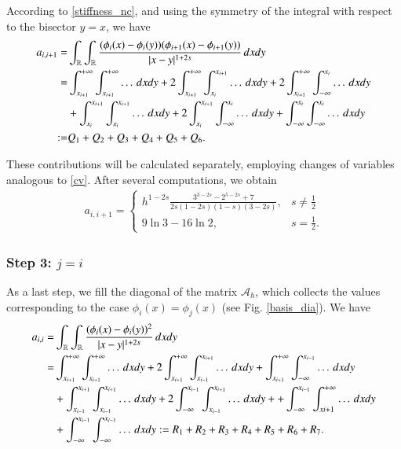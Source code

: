According to \eqref{stiffness_nc}, and using the symmetry of the integral with respect to the bisector $y=x$, we have 
	\begin{align*}
	a_{i,i+1}= & \int_{\mathbb{R}}\int_{\mathbb{R}}\frac{(\phi_i(x)-\phi_i(y))(\phi_{i+1}(x)-\phi_{i+1}(y))}{|x-y|^{1+2s}}\,dxdy
	\\
	= & \int_{x_{i+1}}^{+\infty}\int_{x_{i+1}}^{+\infty} \ldots\,dxdy + 2\int_{x_{i+1}}^{+\infty}\int_{x_i}^{x_{i+1}} \ldots\,dxdy + 2\int_{x_{i+1}}^{+\infty}\int_{-\infty}^{x_i} \ldots\,dxdy 
	\\
	& + \int_{x_i}^{x_{i+1}}\int_{x_i}^{x_{i+1}} \ldots\,dxdy + 2\int_{x_i}^{x_{i+1}}\int_{-\infty}^{x_i} \ldots\,dxdy + \int_{-\infty}^{x_i}\int_{-\infty}^{x_i} \ldots\,dxdy 
	\\
	:= & Q_1 + Q_2 + Q_3 + Q_4 + Q_5 + Q_6.
\end{align*}

These contributions will be calculated separately, employing changes of variables analogous to \eqref{cv}. After several computations, we obtain
\begin{align*}
	a_{i,i+1} = \begin{cases}
					\displaystyle h^{1-2s}\frac{3^{3-2s}-2^{5-2s}+7}{2s(1-2s)(1-s)(3-2s)}, & \displaystyle s\neq \frac{1}{2}
					\\
					9\ln 3-16\ln 2, & \displaystyle s=\frac{1}{2}.
				\end{cases}	
\end{align*}

\subsubsection*{Step 3: $j= i$}
As a last step, we fill the diagonal of the matrix $\mathcal A_h$, which collects the values corresponding to the case $\phi_i(x)=\phi_j(x)$ (see Fig. \ref{basis_dia}). We have
	\begin{align*}
	a_{i,i}= & \int_{\mathbb{R}}\int_{\mathbb{R}}\frac{(\phi_i(x)-\phi_i(y))^2}{|x-y|^{1+2s}}\,dxdy
	\\
	= & \int_{x_{i+1}}^{+\infty}\int_{x_{i+1}}^{+\infty} \ldots\,dxdy + 2\int_{x_{i+1}}^{+\infty}\int_{x_{i-1}}^{x_{i+1}} \ldots\,dxdy + \int_{x_{i+1}}^{+\infty}\int_{-\infty}^{x_{i-1}} \ldots\,dxdy 
	\\
	& + \int_{x_{i-1}}^{x_{i+1}}\int_{x_{i-1}}^{x_{i+1}} \ldots\,dxdy + 2\int_{-\infty}^{x_{i-1}}\int_{x_{i-1}}^{x_{i+1}} \ldots\,dxdy + + \int_{-\infty}^{x_{i-1}}\int_{x{i+1}}^{+\infty} \ldots\,dxdy 
	\\
	& +  \int_{-\infty}^{x_{i-1}}\int_{-\infty}^{x_{i-1}} \ldots\,dxdy := R_1 + R_2 + R_3 + R_4 + R_5 + R_6 + R_7.
\end{align*}

